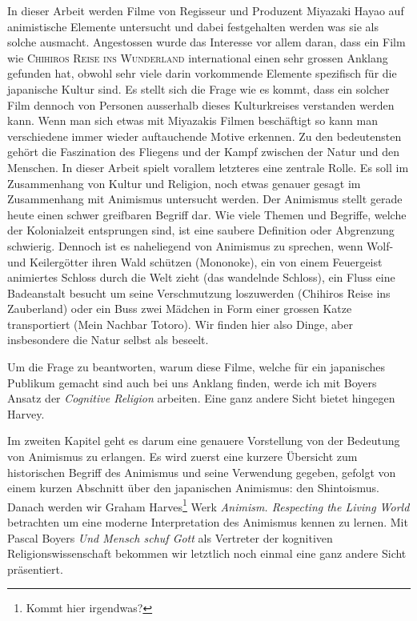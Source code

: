 In dieser Arbeit werden Filme von Regisseur und Produzent Miyazaki Hayao auf animistische Elemente untersucht und dabei festgehalten werden was sie als solche ausmacht.
Angestossen wurde das Interesse vor allem daran, dass ein Film wie \textsc{Chihiros Reise ins Wunderland} international einen sehr grossen Anklang gefunden hat, obwohl sehr viele darin vorkommende Elemente spezifisch für die japanische Kultur sind. Es stellt sich die Frage wie es kommt, dass ein solcher Film dennoch von Personen ausserhalb dieses Kulturkreises verstanden werden kann. Wenn man sich etwas mit Miyazakis Filmen beschäftigt so kann man verschiedene immer wieder auftauchende Motive erkennen. Zu den bedeutensten gehört die Faszination des Fliegens und der Kampf zwischen der Natur und den Menschen. In dieser Arbeit spielt vorallem letzteres eine zentrale Rolle. Es soll im Zusammenhang von Kultur und Religion, noch etwas genauer gesagt im Zusammenhang mit Animismus untersucht werden. Der Animismus stellt gerade heute einen schwer greifbaren Begriff dar. Wie viele Themen und Begriffe, welche der Kolonialzeit entsprungen sind, ist eine saubere Definition oder Abgrenzung schwierig. Dennoch ist es naheliegend von Animismus zu sprechen, wenn Wolf- und Keilergötter ihren Wald schützen (Mononoke), ein von einem Feuergeist animiertes Schloss durch die Welt zieht (das wandelnde Schloss), ein Fluss eine Badeanstalt besucht um seine Verschmutzung loszuwerden (Chihiros Reise ins Zauberland) oder ein Buss zwei Mädchen in Form einer grossen Katze transportiert (Mein Nachbar Totoro). Wir finden hier also Dinge, aber insbesondere die Natur selbst als beseelt. 

Um die Frage zu beantworten, warum diese Filme, welche für ein japanisches Publikum gemacht sind auch bei uns Anklang finden, werde ich mit Boyers Ansatz der \emph{Cognitive Religion} arbeiten. Eine ganz andere Sicht bietet hingegen Harvey.

Im zweiten Kapitel geht es darum eine genauere Vorstellung von der Bedeutung von Animismus zu erlangen. Es wird zuerst eine kurzere Übersicht zum historischen Begriff des Animismus und seine Verwendung gegeben, gefolgt von einem kurzen Abschnitt über den japanischen Animismus: den Shintoismus. Danach werden wir Graham Harves\footnote{Kommt hier irgendwas?} Werk \emph{Animism. Respecting the Living World} betrachten um eine moderne Interpretation des Animismus kennen zu lernen. Mit Pascal Boyers \emph{Und Mensch schuf Gott} als Vertreter der kognitiven Religionswissenschaft bekommen wir letztlich noch einmal eine ganz andere Sicht präsentiert.

